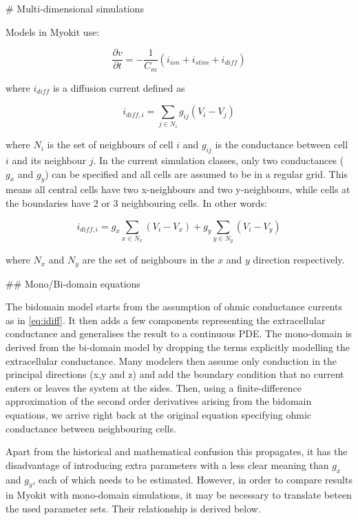 # Multi-dimensional simulations

Models in Myokit use:
\begin{linenomath}
\begin{equation}
\frac{\partial v}{\partial t}=-\frac{1}{C_{m}}(i_{\mathit{ion}}+i_{\mathit{stim}}+i_{\mathit{diff}})\label{eq:dv/dt}
\end{equation}
\end{linenomath}
where $i_\mathit{diff}$ is a diffusion current defined as
\begin{linenomath}
\begin{equation}
i_{\mathit{diff},i}=\sum_{j\in N_{i}}g_{ij}\left(V_{i}-V_{j}\right)\label{eq:idiff}
\end{equation}
\end{linenomath}
where $N_{i}$ is the set of neighbours of cell $i$ and $g_{ij}$
is the conductance between cell $i$ and its neighbour $j$. In the
current simulation classes, only two conductances ($g_{x}$ and $g_{y}$)
can be specified and all cells are assumed to be in a regular grid.
This means all central cells have two x-neighbours and two y-neighbours,
while cells at the boundaries have 2 or 3 neighbouring cells. In other
words:
\begin{linenomath}
\begin{equation}
i_{\mathit{diff},i}=g_{x}\sum_{x\in N_{x}}\left(V_{i}-V_{x}\right)+g_{y}\sum_{y\in N_{y}}\left(V_{i}-V_{y}\right)
\end{equation}
\end{linenomath}
where $N_{x}$ and $N_{y}$ are the set of neighbours in the $x$
and $y$ direction respectively.


## Mono/Bi-domain equations

The bidomain model starts from the assumption of ohmic conductance
currents as in \ref{eq:idiff}. It then adds a few components representing
the extracellular conductance and generalises the result to a continuous
PDE. The mono-domain is derived from the bi-domain model by dropping
the terms explicitly modelling the extracellular conductance. Many
modelers then assume only conduction in the principal directions (x,y
and z) and add the boundary condition that no current enters or leaves
the system at the sides. Then, using a finite-difference approximation
of the second order derivatives arising from the bidomain equations,
we arrive right back at the original equation specifying ohmic conductance
between neighbouring cells.

Apart from the historical and mathematical confusion this propagates,
it has the disadvantage of introducing extra parameters with a less
clear meaning than $g_{x}$ and $g_{y}$, each of which needs to be
estimated. However, in order to compare results in Myokit with mono-domain
simulations, it may be necessary to translate beteen the used parameter
sets. Their relationship is derived below.

